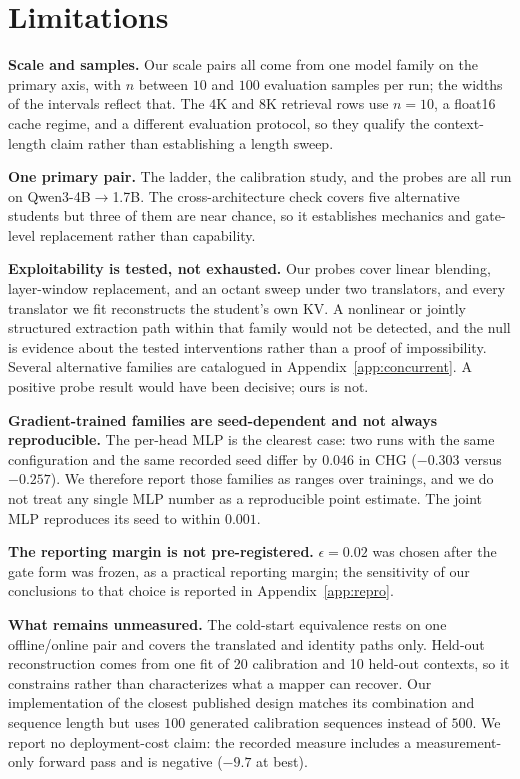 \documentclass[10pt]{article}
\newcommand{\kv}{\ensuremath{\mathrm{KV}}}
\begin{document}

\section{Limitations}
\label{sec:limitations}

\textbf{Scale and samples.} Our scale pairs all come from one model family on
the primary axis, with $n$ between $10$ and $100$ evaluation samples per run;
the widths of the intervals reflect that. The $4$K and $8$K retrieval rows use
$n{=}10$, a float16 cache regime, and a different evaluation protocol, so they
qualify the context-length claim rather than establishing a length sweep.

\textbf{One primary pair.} The ladder, the calibration study, and the probes are
all run on Qwen3-4B$\to$1.7B. The cross-architecture check covers five
alternative students but three of them are near chance, so it establishes
mechanics and gate-level replacement rather than capability.

\textbf{Exploitability is tested, not exhausted.} Our probes cover linear
blending, layer-window replacement, and an octant sweep under two translators,
and every translator we fit reconstructs the student's own \kv{}. A nonlinear or
jointly structured extraction path within that family would not be detected, and
the null is evidence about the tested interventions rather than a proof of
impossibility. Several alternative families are catalogued in
Appendix~\ref{app:concurrent}. A positive probe result would have been decisive;
ours is not.

\textbf{Gradient-trained families are seed-dependent and not always
reproducible.} The per-head MLP is the clearest case: two runs with the same
configuration and the same recorded seed differ by $0.046$ in CHG
($-0.303$ versus $-0.257$). We therefore report those families as ranges over
trainings, and we do not treat any single MLP number as a reproducible point
estimate. The joint MLP reproduces its seed to within $0.001$.

\textbf{The reporting margin is not pre-registered.} $\epsilon{=}0.02$ was
chosen after the gate form was frozen, as a practical reporting margin; the
sensitivity of our conclusions to that choice is reported in
Appendix~\ref{app:repro}.

\textbf{What remains unmeasured.} The cold-start equivalence rests on one
offline/online pair and covers the translated and identity paths only. Held-out
reconstruction comes from one fit of 20 calibration and 10 held-out contexts, so
it constrains rather than characterizes what a mapper can recover. Our
implementation of the closest published design matches its combination and
sequence length but uses $100$ generated calibration sequences instead of $500$.
We report no deployment-cost claim: the recorded measure includes a
measurement-only forward pass and is negative ($-9.7$ at best).
\end{document}
